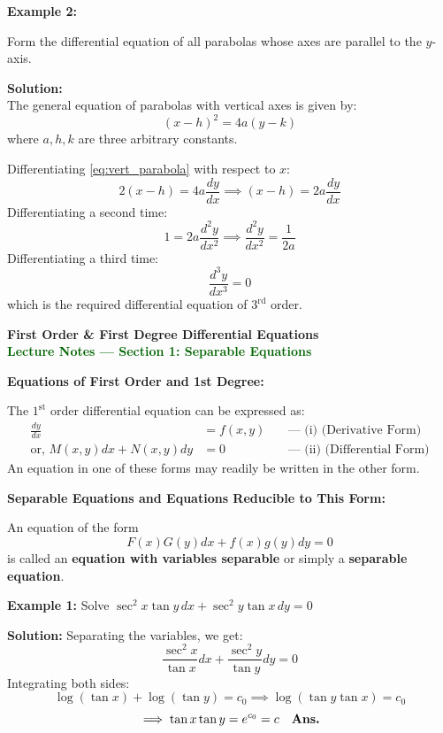 \documentclass[11pt,a4paper]{article}
\newcommand{\Heading}[1]{\vspace{0.3cm}\noindent\textbf{\textcolor{AcademicGreen}{\large #1}}\par\vspace{0.15cm}}
\begin{document}
\Heading{Example 2:}
Form the differential equation of all parabolas whose axes are parallel to the $y$-axis.

\noindent\textbf{Solution:} \\
The general equation of parabolas with vertical axes is given by:
\begin{equation}
    (x - h)^2 = 4a(y - k) \label{eq:vert_parabola}
\end{equation}
where $a, h, k$ are three arbitrary constants.

\noindent Differentiating \eqref{eq:vert_parabola} with respect to $x$:
\[ 2(x - h) = 4a \frac{dy}{dx} \implies (x - h) = 2a \frac{dy}{dx} \]
Differentiating a second time:
\[ 1 = 2a \frac{d^2y}{dx^2} \implies \frac{d^2y}{dx^2} = \frac{1}{2a} \]
Differentiating a third time:
\[ \frac{d^3y}{dx^3} = 0 \]
which is the required differential equation of $3^{\text{rd}}$ order.

\newpage

\begin{center}
    {\LARGE\bfseries\textcolor{AcademicGreen}{First Order \& First Degree Differential Equations}} \\[0.2cm]
    {\small\textcolor{DarkGreen}{\textbf{Lecture Notes --- Section 1: Separable Equations}}}
    \vspace{0.3cm}
\end{center}

\Heading{Equations of First Order and 1st Degree:}
The $1^{\text{st}}$ order differential equation can be expressed as:
\begin{align}
    \frac{dy}{dx} &= f(x,y) \quad &\text{--- (i) (Derivative Form)} \label{eq:deriv_form} \\
    \text{or, } M(x,y)dx + N(x,y)dy &= 0 \quad &\text{--- (ii) (Differential Form)} \label{eq:diff_form}
\end{align}
An equation in one of these forms may readily be written in the other form.

\Heading{Separable Equations and Equations Reducible to This Form:}
An equation of the form
\[
F(x)G(y)dx + f(x)g(y)dy = 0
\]
is called an \textbf{equation with variables separable} or simply a \textbf{separable equation}.

\vspace{0.3cm}
\begin{tcolorbox}[greenbox]
    \textbf{\textcolor{AcademicGreen}{Example 1:}} Solve $\sec^2 x \tan y \, dx + \sec^2 y \tan x \, dy = 0$
    
    \vspace{0.2cm}
    \noindent\textbf{Solution:} Separating the variables, we get:
    \[
    \frac{\sec^2 x}{\tan x} dx + \frac{\sec^2 y}{\tan y} dy = 0
    \]
    Integrating both sides:
    \[
    \log(\tan x) + \log(\tan y) = c_0 \implies \log(\tan y \tan x) = c_0
    \]
    \[
    \implies \tan x \tan y = e^{c_0} = c \quad \text{\textbf{Ans.}}
    \]
\end{tcolorbox}
\end{document}
